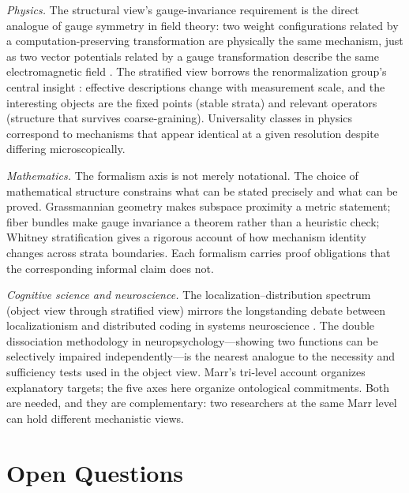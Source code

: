 \documentclass[11pt]{article}
\theoremstyle{remark}
\begin{document}
\emph{Physics.}
The structural view's gauge-invariance requirement is the direct
analogue of gauge symmetry in field theory: two weight configurations
related by a computation-preserving transformation are physically
the same mechanism, just as two vector potentials related by a gauge
transformation describe the same electromagnetic field
\citep{nakahara2003}.  The stratified view borrows the renormalization
group's central insight \citep{wilson1971,goldenfeld1992}: effective
descriptions change with measurement scale, and the interesting
objects are the fixed points (stable strata) and relevant operators
(structure that survives coarse-graining).  Universality classes
in physics correspond to mechanisms that appear identical at a given
resolution despite differing microscopically.

\emph{Mathematics.}
The formalism axis is not merely notational.  The choice of
mathematical structure constrains what can be stated precisely and
what can be proved.  Grassmannian geometry \citep{nakahara2003}
makes subspace proximity a metric statement; fiber bundles make
gauge invariance a theorem rather than a heuristic check; Whitney
stratification \citep{whitney1965,golubitsky1973} gives a rigorous
account of how mechanism identity changes across strata boundaries.
Each formalism carries proof obligations that the corresponding
informal claim does not.

\emph{Cognitive science and neuroscience.}
The localization--distribution spectrum (object view through stratified
view) mirrors the longstanding debate between localizationism and
distributed coding in systems neuroscience
\citep{bechtel1993}.  The double dissociation methodology in
neuropsychology---showing two functions can be selectively impaired
independently---is the nearest analogue to the necessity and
sufficiency tests used in the object view.  Marr's tri-level account
\citep{marr1982} organizes explanatory targets; the five axes here
organize ontological commitments.  Both are needed, and they are
complementary: two researchers at the same Marr level can hold different
mechanistic views.

\section{Open Questions}\label{sec:open}
\end{document}
